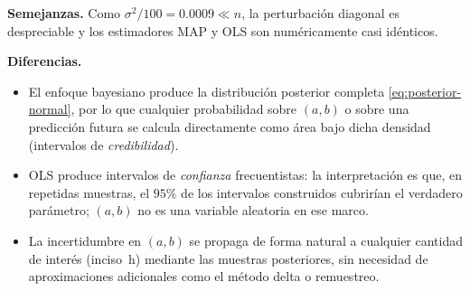 \documentclass[a4paper,11pt]{article}
\theoremstyle{remark}
\begin{document}
\begin{enumerate}[a)]
\textbf{Semejanzas.} Como $\sigma^2/100 = 0.0009 \ll n$, la
perturbación diagonal es despreciable y los estimadores MAP y OLS son
numéricamente casi idénticos.

\textbf{Diferencias.}
\begin{itemize}
  \item El enfoque bayesiano produce la distribución posterior completa
    \eqref{eq:posterior-normal}, por lo que cualquier probabilidad sobre
    $(a,b)$ o sobre una predicción futura se calcula directamente como
    área bajo dicha densidad (intervalos de \emph{credibilidad}).
  \item OLS produce intervalos de \emph{confianza} frecuentistas: la
    interpretación es que, en repetidas muestras, el $95\%$ de los
    intervalos construidos cubrirían el verdadero parámetro; $(a,b)$ no
    es una variable aleatoria en ese marco.
  \item La incertidumbre en $(a,b)$ se propaga de forma natural a
    cualquier cantidad de interés (inciso~h) mediante las muestras
    posteriores, sin necesidad de aproximaciones adicionales como el
    método delta o remuestreo.
\end{itemize}

\end{enumerate}
\end{document}
